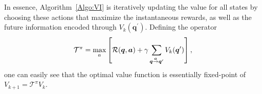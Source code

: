 In essence, Algorithm~\ref{Algo:VI} is iteratively updating the value for all states by choosing these actions that maximize the instantaneous rewards, as well as the future information encoded through $V_{k}(\bm{q}^{\prime})$. Defining the operator $$\mathcal{T}^{\pi} = \max_{a} \left[\mathcal{R}(\bm{q}, \bm{a}) + \gamma \sum_{\bm{q} \goesto[\bm{a}]\bm{q}^{\prime}}V_{k}(\bm{q}^{\prime})\right],$$ one can easily see that the optimal value function is essentially  fixed-point of $V_{k+1} = \mathcal{T}^{\pi}  V_{k}$. 
